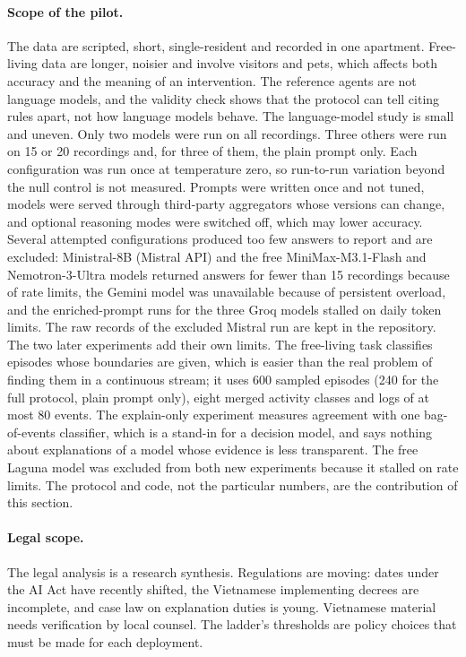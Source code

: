 \documentclass[11pt,a4paper]{article}
\begin{document}
\paragraph{Scope of the pilot.} The data are scripted, short, single-resident and recorded in one apartment. Free-living data are longer, noisier and involve visitors and pets, which affects both accuracy and the meaning of an intervention. The reference agents are not language models, and the validity check shows that the protocol can tell citing rules apart, not how language models behave. The language-model study is small and uneven. Only two models were run on all recordings. Three others were run on 15 or 20 recordings and, for three of them, the plain prompt only. Each configuration was run once at temperature zero, so run-to-run variation beyond the null control is not measured. Prompts were written once and not tuned, models were served through third-party aggregators whose versions can change, and optional reasoning modes were switched off, which may lower accuracy. Several attempted configurations produced too few answers to report and are excluded: Ministral-8B (Mistral API) and the free MiniMax-M3.1-Flash and Nemotron-3-Ultra models returned answers for fewer than 15 recordings because of rate limits, the Gemini model was unavailable because of persistent overload, and the enriched-prompt runs for the three Groq models stalled on daily token limits. The raw records of the excluded Mistral run are kept in the repository. The two later experiments add their own limits. The free-living task classifies episodes whose boundaries are given, which is easier than the real problem of finding them in a continuous stream; it uses 600 sampled episodes (240 for the full protocol, plain prompt only), eight merged activity classes and logs of at most 80 events. The explain-only experiment measures agreement with one bag-of-events classifier, which is a stand-in for a decision model, and says nothing about explanations of a model whose evidence is less transparent. The free Laguna model was excluded from both new experiments because it stalled on rate limits. The protocol and code, not the particular numbers, are the contribution of this section.

\paragraph{Legal scope.} The legal analysis is a research synthesis. Regulations are moving: dates under the AI Act have recently shifted, the Vietnamese implementing decrees are incomplete, and case law on explanation duties is young. Vietnamese material needs verification by local counsel. The ladder's thresholds are policy choices that must be made for each deployment.
\end{document}
